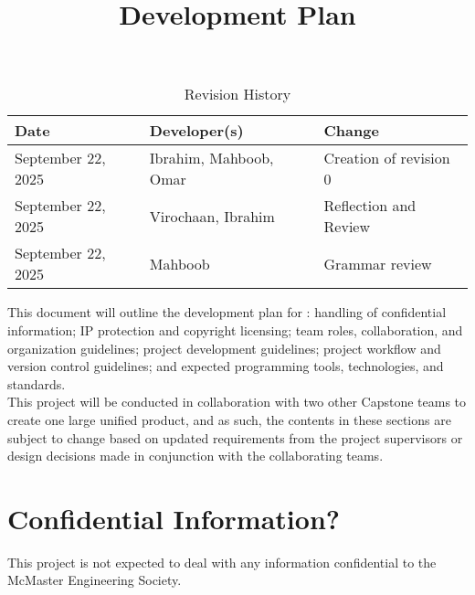 \documentclass{article}
\title{Development Plan\\\progname}
\author{\authname}
\date{}
\begin{document}
\maketitle
\begin{table}[hp]
\caption{Revision History} \label{TblRevisionHistory}
\begin{tabularx}{\textwidth}{llX}
\toprule
\textbf{Date} & \textbf{Developer(s)} & \textbf{Change}\\
\midrule
September 22, 2025 & Ibrahim, Mahboob, Omar & Creation of revision 0\\
September 22, 2025 & Virochaan, Ibrahim & Reflection and Review\\
September 22, 2025 & Mahboob & Grammar review\\
\bottomrule
\end{tabularx}
\end{table}

\newpage{}

This document will outline the development plan for \textbf{\teamname}:
handling of confidential information; IP protection and copyright licensing;
team roles, collaboration, and organization guidelines; project development
guidelines; project workflow and version control guidelines; and expected
programming tools, technologies, and standards.\\

This project will be conducted in collaboration with two other Capstone teams
to create one large unified product, and as such, the contents in these
sections are subject to change based on updated requirements from the project
supervisors or design decisions made in conjunction with the collaborating
teams.

\begin{comment}
\wss{Additional information on the development plan can be found in the
\href{https://gitlab.cas.mcmaster.ca/courses/capstone/-/blob/main/Lectures/L02b_POCAndDevPlan/POCAndDevPlan.pdf?ref_type=heads}
{lecture slides}.}
\end{comment}

\section{Confidential Information?}
\begin{flushleft}
This project is not expected to deal with any information confidential to the McMaster Engineering Society.
\end{flushleft}
\end{document}
